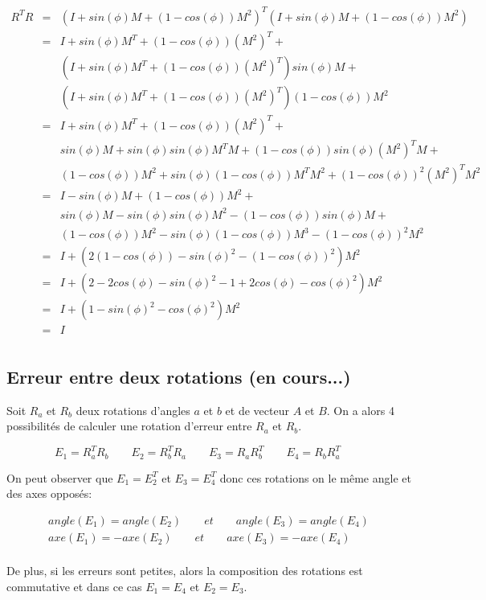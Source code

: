 \documentclass[12pt,a4paper]{article}
\begin{document}
\begin{eqnarray*}
	R^T R&=&(I+sin(\phi)M+(1-cos(\phi))M^2)^T (I+sin(\phi)M+(1-cos(\phi))M^2)\\
	&=&I+sin(\phi)M^T+(1-cos(\phi))(M^2)^T+\\
	&&(I+sin(\phi)M^T+(1-cos(\phi))(M^2)^T)sin(\phi)M+\\
	&&(I+sin(\phi)M^T+(1-cos(\phi))(M^2)^T)(1-cos(\phi))M^2\\
	&=&I+sin(\phi)M^T+(1-cos(\phi))(M^2)^T+\\
	&&sin(\phi)M+sin(\phi)sin(\phi)M^TM+(1-cos(\phi))sin(\phi)(M^2)^TM+\\
	&&(1-cos(\phi))M^2+sin(\phi)(1-cos(\phi))M^TM^2+(1-cos(\phi))^2(M^2)^TM^2\\
	&=&I-sin(\phi)M+(1-cos(\phi))M^2+\\
	&&sin(\phi)M-sin(\phi)sin(\phi)M^2-(1-cos(\phi))sin(\phi)M+\\
	&&(1-cos(\phi))M^2-sin(\phi)(1-cos(\phi))M^3-(1-cos(\phi))^2M^2\\
	&=&I+(2(1-cos(\phi))-sin(\phi)^2-(1-cos(\phi))^2)M^2\\
	&=&I+(2-2cos(\phi)-sin(\phi)^2-1+2cos(\phi)-cos(\phi)^2)M^2\\
	&=&I+(1-sin(\phi)^2-cos(\phi)^2)M^2\\
	&=&I\\	
\end{eqnarray*}

\subsection{Erreur entre deux rotations (en cours...)}

Soit $R_a$ et $R_b$ deux rotations d'angles $a$ et $b$ et de vecteur $A$ et $B$. On a alors 4 possibilités de calculer une rotation d'erreur entre $R_a$ et $R_b$.

\[
\boxed{E_1=R_a^T R_b \qquad
E_2=R_b^T R_a \qquad
E_3=R_a R_b^T \qquad
E_4=R_b R_a^T \qquad}
\]

On peut observer que $E_1=E_2^T$ et $E_3=E_4^T$ donc ces rotations on le même angle et des axes opposés:

\[
\boxed{\begin{array}{c}
angle(E_1)=angle(E_2)\qquad  et\qquad angle(E_3)=angle(E_4) \\
axe(E_1)=-axe(E_2)\qquad  et\qquad axe(E_3)=-axe(E_4)\\
\end{array}}
\]

De plus, si les erreurs sont petites, alors la composition des rotations est commutative et dans ce cas $E_1=E_4$ et $E_2=E_3$. 
\end{document}
